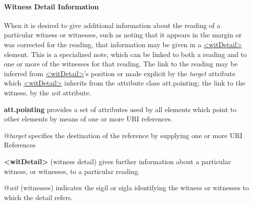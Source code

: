 \paragraph[{Witness Detail Information}]{Witness Detail Information}\label{TCAPWD}\par
When it is desired to give additional information about the reading of a particular witness or witnesses, such as noting that it appears in the margin or was corrected for the reading, that information may be given in a \hyperref[TEI.witDetail]{<witDetail>} element. This is a specialized note, which can be linked to both a reading and to one or more of the witnesses for that reading. The link to the reading may be inferred from \hyperref[TEI.witDetail]{<witDetail>}'s position or made explicit by the {\itshape target} attribute which \hyperref[TEI.witDetail]{<witDetail>} inherits from the attribute class \textsf{att.pointing}; the link to the witness, by the {\itshape wit} attribute. 
\begin{sansreflist}
  
\item [\textbf{att.pointing}] provides a set of attributes used by all elements which point to other elements by means of one or more URI references.\hfil\\[-10pt]\begin{sansreflist}
    \item[@{\itshape target}]
  specifies the destination of the reference by supplying one or more URI References
\end{sansreflist}  
\item [\textbf{<witDetail>}] (witness detail) gives further information about a particular witness, or witnesses, to a particular reading.\hfil\\[-10pt]\begin{sansreflist}
    \item[@{\itshape wit}]
  (witnesses) indicates the sigil or sigla identifying the witness or witnesses to which the detail refers.
\end{sansreflist}  
\end{sansreflist}
\par
